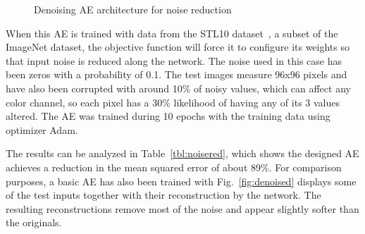 \begin{figure}[ht]
    \centering\small
    \caption{Denoising AE architecture for noise reduction}
    \label{fig:graph-denoising}
\end{figure}

When this AE is trained with data from the STL10 dataset~, a subset of the ImageNet dataset, the objective function will force it to configure its weights so that input noise is reduced along the network. The noise used in this case has been zeros with a probability of 0.1. The test images measure 96x96 pixels and have also been corrupted with around 10\% of noisy values, which can affect any color channel, so each pixel has a 30\% likelihood of having any of its 3 values altered. The AE was trained during 10 epochs with the training data using optimizer Adam. 

The results can be analyzed in Table~\ref{tbl:noisered}, which shows the designed AE achieves a reduction in the mean squared error of about 89\%. For comparison purposes, a basic AE has also been trained with  Fig.~\ref{fig:denoised} displays some of the test inputs together with their reconstruction by the network. The resulting reconstructions remove most of the noise and appear slightly softer than the originals. 

